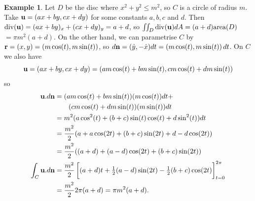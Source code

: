 \documentclass[reqno]{amsart}
\theoremstyle{definition}
\newtheorem{example}[theorem]{Example}
\begin{document}
\begin{example}
 Let $D$ be the disc where $x^2+y^2\leq m^2$, so $C$ is a circle of
 radius $m$.  Take $\mathbf{u}=(ax+by,cx+dy)$ for some constants $a,b,c$ and
 $d$.  Then $\operatorname{div}(\mathbf{u})=(ax+by)_x+(cx+dy)_y=a+d$, so
 $\iint_D\operatorname{div}(\mathbf{u})dA=(a+d) \text{area}(D)$$ = \pi m^2(a+d)$.  On the
 other hand, we can parametrise $C$ by
 $\mathbf{r}=(x,y)=(m\cos(t),m\sin(t))$, so
 $d\mathbf{n}=(\dot{y},-\dot{x})dt=(m\cos(t),m\sin(t))\,dt$.  On $C$ we also
 have
 \[ \mathbf{u}=(ax+by,cx+dy) =
     (am\cos(t)+bm\sin(t),cm\cos(t)+dm\sin(t)) 
 \] 
 so
 \begin{align*}
  \vu.d\vn &= (am\cos(t)+bm\sin(t))(m\cos(t))dt + \\
           &\hspace{2em} (cm\cos(t)+dm\sin(t))(m\sin(t))dt \\
   &= m^2(a\cos^2(t)+ (b+c)\sin(t)\cos(t) + d\sin^2(t))dt \\
   &= \frac{m^2}{2}(a+a\cos(2t)+(b+c)\sin(2t)+d-d\cos(2t)) \\
   &= \frac{m^2}{2}((a+d)+(a-d)\cos(2t)+(b+c)\sin(2t)) \\
  \int_C\vu.d\vn &
   =\frac{m^2}{2}
    \CH{(a+d)t+\half(a-d)\sin(2t)-\half(b+c)\cos(2t)}_{t=0}^{2\pi} \\
   &= \frac{m^2}{2}2\pi(a+d) = \pi m^2(a+d).
 \end{align*}
\end{example}
\end{document}

